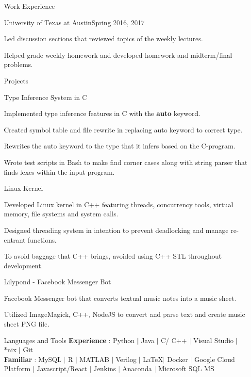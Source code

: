 \documentclass{resume} %
\begin{document}
\begin{rSection}{\large Work Experience}
\begin{rSubsection}{University of Texas at Austin}{Spring 2016, 2017}{}{}
\item Led discussion sections that reviewed topics of the weekly lectures.
\item Helped grade weekly homework and developed homework and midterm/final problems.
\end{rSubsection}

\end{rSection}

\begin{rSection}{\large Projects}
\begin{rSubsection}{Type Inference System in C}{{}}{}{}
     \item Implemented type inference features in C with the \textbf{auto} keyword.
     \item Created symbol table and file rewrite in replacing auto keyword to correct type.
     \item Rewrites the auto keyword to the type that it infers based on the C-program.
     \item Wrote test scripts in Bash to make find corner cases along with string parser that finds lexes within the input program.
\end{rSubsection}
\begin{rSubsection}{Linux Kernel}{}{}{}
     \item Developed Linux kernel in C++ featuring threads, concurrency tools, virtual memory, file systems and system calls. 
     \item Designed threading system in intention to prevent deadlocking and manage re-entrant functions.
     \item To avoid baggage that C++ brings, avoided using C++ STL throughout development.
\end{rSubsection}
\begin{rSubsection}{Lilypond - Facebook Messenger Bot}{}{}{}
     \item Facebook Messenger bot that converts textual music notes into a music sheet.
    \item Utilized ImageMagick, C++, NodeJS to convert and parse text and create
    music sheet PNG file. 
\end{rSubsection}
\end{rSection}

\begin{rSection}{\large Languages and Tools}
    \textbf{Experience} : Python $\vert$ Java $\vert$ C/ C++ $\vert$ Visual Studio  $\vert$ *nix $\vert$ Git\\
    \textbf{Familiar} : MySQL $\vert$ R $\vert$ MATLAB $\vert$
    Verilog $\vert$  \LaTeX  $\vert$  Docker  $\vert$ Google Cloud Platform $\vert$ Javascript/React $\vert$ Jenkins $\vert$ Anaconda $\vert$ Microsoft SQL MS 
\end{rSection}      

\end{document}
